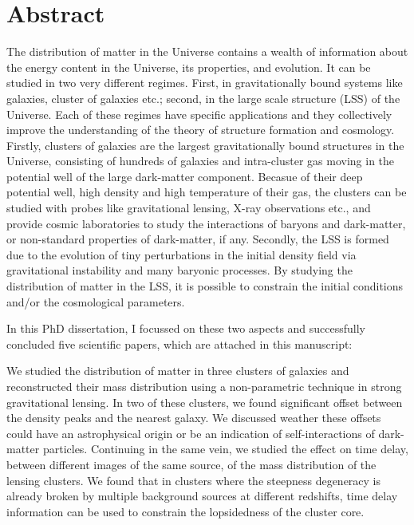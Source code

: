 {}


\chapter*{Abstract}

The distribution of matter in the Universe contains a wealth of information about 
the energy content in the Universe, its properties, and evolution. It can 
be studied in two very different regimes. First, in gravitationally 
bound systems like galaxies, cluster of galaxies etc.; second, in the 
large scale structure (LSS) of the Universe. Each of these regimes have specific
applications and they collectively improve the understanding of the theory of 
structure formation and cosmology.  Firstly, clusters of galaxies are
the largest gravitationally bound structures in the Universe, consisting
of hundreds of galaxies and intra-cluster gas moving in the potential well 
of the large dark-matter component. Becasue of their deep potential well, high 
density and high temperature of their gas, the clusters can be studied with probes like 
gravitational lensing, X-ray observations etc., and provide cosmic 
laboratories to study the interactions of baryons and dark-matter, or
non-standard properties of dark-matter, if any.
Secondly, the LSS is 
formed due to the evolution 
of tiny perturbations in the initial density field via gravitational 
instability and many baryonic processes. By studying the 
distribution of matter in the LSS, it is possible to constrain the initial
conditions and/or the cosmological parameters. 

In this PhD dissertation, I focussed on these two aspects and successfully 
concluded five scientific papers, which are attached in this manuscript:

We studied the distribution of matter in three clusters of galaxies
and reconstructed their mass distribution using a non-parametric technique in 
strong gravitational lensing. In two of these clusters, we found significant offset
between the density peaks and the nearest galaxy. We discussed weather these offsets
could have an astrophysical origin or be an indication of self-interactions
of dark-matter particles.
Continuing in the same vein, we studied
the effect on time delay, between different images of the same source,
of the mass distribution of the lensing clusters. We found that in clusters
where the steepness degeneracy is already broken by multiple background sources
at different redshifts, time delay information can be used to constrain
the lopsidedness of the cluster core.

